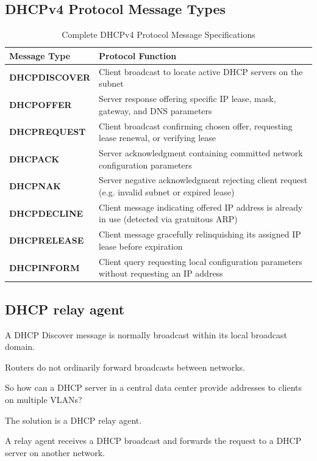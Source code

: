 \subsection{DHCPv4 Protocol Message Types}
\begin{table}[htbp]
\centering
\caption{Complete DHCPv4 Protocol Message Specifications}
\label{tab:dhcp_message_specifications}
\begin{tabularx}{\textwidth}{p{3.2cm} X}
\toprule
\textbf{Message Type} & \textbf{Protocol Function} \\
\midrule
\textbf{DHCPDISCOVER} & Client broadcast to locate active DHCP servers on the subnet \\
\textbf{DHCPOFFER} & Server response offering specific IP lease, mask, gateway, and DNS parameters \\
\textbf{DHCPREQUEST} & Client broadcast confirming chosen offer, requesting lease renewal, or verifying lease \\
\textbf{DHCPACK} & Server acknowledgment containing committed network configuration parameters \\
\textbf{DHCPNAK} & Server negative acknowledgment rejecting client request (e.g. invalid subnet or expired lease) \\
\textbf{DHCPDECLINE} & Client message indicating offered IP address is already in use (detected via gratuitous ARP) \\
\textbf{DHCPRELEASE} & Client message gracefully relinquishing its assigned IP lease before expiration \\
\textbf{DHCPINFORM} & Client query requesting local configuration parameters without requesting an IP address \\
\bottomrule
\end{tabularx}
\end{table}


\subsection{DHCP relay agent}

A DHCP Discover message is normally broadcast within its local broadcast domain.

Routers do not ordinarily forward broadcasts between networks.

So how can a DHCP server in a central data center provide addresses to clients on multiple VLANs?

The solution is a DHCP relay agent.

A relay agent receives a DHCP broadcast and forwards the request to a DHCP server on another network.

